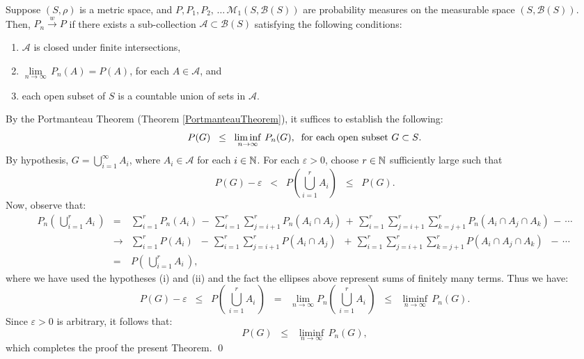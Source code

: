 \begin{theorem}
\mbox{}
\vskip 0.1cm
\noindent
Suppose $\left(S,\rho\right)$ is a metric space, and
$P, P_{1}, P_{2}, \,\ldots\,\mathcal{M}_{1}\!\left(S,\mathcal{B}(S)\right)$
are probability measures on the measurable space $\left(S,\mathcal{B}(S)\right)$.
Then, $P_{n} \overset{w}{\longrightarrow} P$ if there exists a sub-collection
$\mathcal{A} \subset \mathcal{B}(S)$ satisfying the following conditions:
\begin{enumerate}
\item	$\mathcal{A}$ is closed under finite intersections,
\item	$\underset{n\rightarrow\infty}{\lim}\,P_{n}(A) = P(A)$, for each $A \in \mathcal{A}$, and
\item	each open subset of $S$ is a countable union of sets in $\mathcal{A}$.
\end{enumerate}
\end{theorem}
\proof
\vskip 0.1cm
\noindent
By the Portmanteau Theorem (Theorem \ref{PortmanteauTheorem}), it suffices to
establish the following:
\begin{equation*}
P(G) \;\; \leq \;\; \liminf_{n\rightarrow\infty}\,P_{n}(G),
\;\;\textnormal{for each open subset $G \subset S$}.
\end{equation*}
By hypothesis, $G = \bigcup_{i=1}^{\infty}A_{i}$, where $A_{i} \in \mathcal{A}$ for each $i \in \mathbb{N}$.
For each $\varepsilon > 0$, choose $r \in \mathbb{N}$ sufficiently large such that
\begin{equation*}
P(G) - \varepsilon \;\; < \;\; P\!\left(\bigcup_{i=1}^{r}A_{i}\right) \;\; \leq \;\; P(G).
\end{equation*}
Now, observe that:
\begin{eqnarray*}
P_{n}\!\left(\,\bigcup_{i=1}^{r}A_{i}\,\right)
&=& \sum_{i=1}^{r}P_{n}\!\left(A_{i}\right) \,-\, \sum_{i=1}^{r}\sum_{j=i+1}^{r}P_{n}\!\left(A_{i}\cap A_{j}\right)
	\,+\, \sum_{i=1}^{r}\sum_{j=i+1}^{r}\sum_{k=j+1}^{r}P_{n}\!\left(A_{i}\cap A_{j}\cap A_{k}\right)
	\,-\, \cdots
\\
&\longrightarrow&
 \sum_{i=1}^{r}P\!\left(A_{i}\right) \;\;-\, \sum_{i=1}^{r}\sum_{j=i+1}^{r}P\!\left(A_{i}\cap A_{j}\right)
	\;\;+\, \sum_{i=1}^{r}\sum_{j=i+1}^{r}\sum_{k=j+1}^{r}P\!\left(A_{i}\cap A_{j}\cap A_{k}\right)
	\;\;-\, \cdots
\\
&=& P\!\left(\,\bigcup_{i=1}^{r}A_{i}\,\right),
\end{eqnarray*}
where we have used the hypotheses (i) and (ii) and the fact the ellipses above represent sums of finitely many terms.
Thus we have:
\begin{equation*}
P(G) - \varepsilon
\;\; \leq \;\; P\!\left(\,\bigcup_{i=1}^{r}A_{i}\,\right)
\;\; = \;\; \lim_{n\rightarrow\infty}P_{n}\!\left(\,\bigcup_{i=1}^{r}A_{i}\,\right)
\;\; \leq \;\; \liminf_{n\rightarrow\infty}\,P_{n}(G).
\end{equation*}
Since $\varepsilon > 0$ is arbitrary, it follows that:
\begin{equation*}
P(G) \;\; \leq \;\; \liminf_{n\rightarrow\infty}\,P_{n}(G),
\end{equation*}
which completes the proof the present Theorem.
\qed


